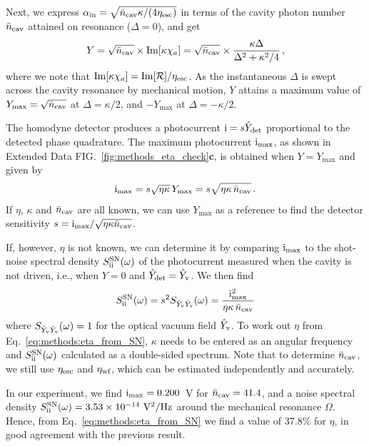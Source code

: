 \documentclass[./Main-revtex.tex]{subfiles}
\begin{document}
Next, we express $\alpha_\text{in} = \sqrt{\bar{n}_\text{cav}\kappa/(4\eta_\text{esc})}$ in terms of the cavity photon number $\bar{n}_\text{cav}$ attained on resonance ($\Delta = 0$), and get
\begin{align}
    Y = \sqrt{\bar{n}_\text{cav}}\times\operatorname{Im}[\kappa \chi_a] = \sqrt{\bar{n}_\text{cav}}\times\frac{\kappa\Delta}{\Delta^2 + \kappa^2/4}\,,
\end{align}
where we note that $\operatorname{Im}[\kappa \chi_a] = \operatorname{Im}[\mathcal{R}]/\eta_\text{esc}$.
As the instantaneous $\Delta$ is swept across the cavity resonance by mechanical motion, $Y$ attains a maximum value of $Y_\text{max} = \sqrt{\bar{n}_\text{cav}}$ at $\Delta = \kappa/2$, and $-Y_\text{max}$ at $\Delta = - \kappa/2$.

The homodyne detector produces a photocurrent $\mathrm{i} = s \hat{Y}_{\text{det}}$ proportional to the detected phase quadrature. The maximum photocurrent $\mathrm{i}_\text{max}$, as shown in Extended Data FIG.~\ref{fig:methods_eta_check}\textbf{c}, is obtained when $Y = Y_\text{max}$ and given by
\begin{align}
    \mathrm{i}_\text{max} = s \sqrt{\eta\kappa}\,Y_\text{max} = s \sqrt{\eta\kappa\,\bar{n}_\text{cav}}\,.
\end{align}
If $\eta$, $\kappa$ and $\bar{n}_\text{cav}$ are all known, we can use $Y_\text{max}$ as a reference to find the detector sensitivity $s = \mathrm{i}_\text{max} / \sqrt{\eta \kappa \bar{n}_\text{cav}}$.

If, however, $\eta$ is not known, we can determine it by comparing $\mathrm{i}_\text{max}$ to the shot-noise spectral density $S_{\mathrm{i}\mathrm{i}}^\text{SN}(\omega)$ of the photocurrent measured when the cavity is not driven, i.e., when $Y=0$ and $\hat{Y}_{\text{det}} = \hat{Y}_{\text{v}}$. We then find
\begin{align}
    S_{\mathrm{i}\mathrm{i}}^\text{SN}(\omega) = s^2 S_{\hat{Y}_{\text{v}}\hat{Y}_{\text{v}}}(\omega) = \frac{\mathrm{i}_\text{max}^2}{\eta \kappa\,\bar{n}_\text{cav}} \label{eq:methods:eta_from_SN}
\end{align}
where $S_{\hat{Y}_{\text{v}}\hat{Y}_{\text{v}}}(\omega) = 1$ for the optical vacuum field $\hat{Y}_{\text{v}}$.
To work out $\eta$ from Eq.~\eqref{eq:methods:eta_from_SN}, $\kappa$ needs to be entered as an angular frequency and $S_{\mathrm{i}\mathrm{i}}^\text{SN}(\omega)$ calculated as a double-sided spectrum. Note that to determine $\bar{n}_\text{cav}$, we still use $\eta_\text{esc}$ and $\eta_\text{wf}$, which can be estimated independently and accurately.

In our experiment, we find $\mathrm{i}_\text{max} = 0.200$~V for $\bar{n}_\text{cav} = 41.4$, and a noise spectral density $S_{\mathrm{i}\mathrm{i}}^\text{SN}(\omega) = 3.53 \times 10^{-14}\  \mathrm{V}^2/\mathrm{Hz}$ around the mechanical resonance $\Omega$. Hence, from Eq.~\eqref{eq:methods:eta_from_SN} we find a value of 37.8\% for $\eta$, in good agreement with the previous result.
\end{document}
